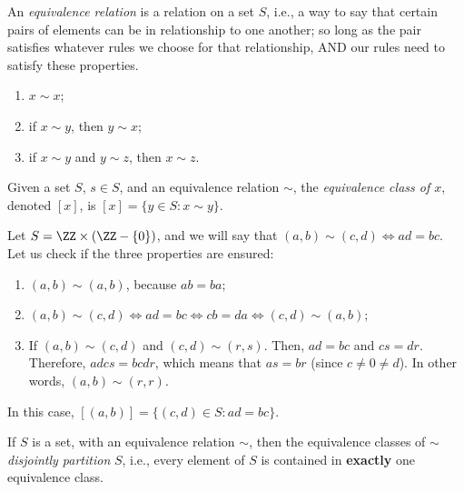 
\begin{defn}
	An \emph{equivalence relation} is a relation on a set $S$, i.e., a way to say that certain pairs of elements can be in relationship to one another; so long as the pair satisfies whatever rules we choose for that relationship, AND our rules need to satisfy these properties.
	\begin{enumerate}
		\item $x \sim x$;
		\item if $x \sim y$, then $y \sim x$;
		\item if $x \sim y$ and $y \sim z$, then $x \sim z$.
	\end{enumerate}
\end{defn}

\begin{defn}
	Given a set $S$, $s \in S$, and an equivalence relation $\sim$, the \emph{equivalence class of $x$}, denoted $[x]$, is  $[x] = \{y \in S : x \sim y\}$.
\end{defn}

\begin{exmp}
	Let $S = \ZZ \times (\ZZ - \{ 0 \})$, and we will say that $(a, b) \sim (c, d) \iff ad = bc$. Let us check if the three properties are ensured:
	\begin{enumerate}
		\item $(a, b) \sim (a, b)$, because $ab = ba$;
		\item $(a, b) \sim (c, d) \iff ad = bc \iff cb = da \iff (c, d) \sim (a, b)$;
		\item If $(a, b) \sim (c, d)$ and $(c, d) \sim (r, s)$.
			Then, $ad = bc$ and  $cs = dr$. Therefore,  $adcs = bcdr$, which means that $as = br$ (since $c \neq 0 \neq d$). In other words, $(a, b) \sim (r, r)$.
	\end{enumerate}

	In this case, $[(a, b)] = \{(c, d) \in S : ad = bc\}$.
\end{exmp}

\begin{thm}
	If $S$ is a set, with an equivalence relation  $\sim$, then the equivalence classes of  $\sim$ \emph{disjointly partition} $S$, i.e., every element of  $S$ is contained in \textbf{exactly} one equivalence class.
\end{thm}


